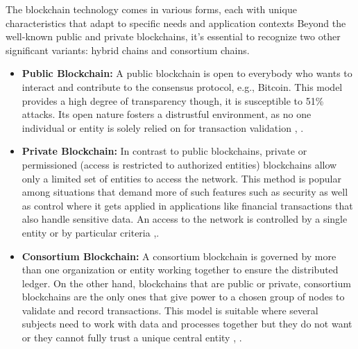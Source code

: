 The blockchain technology comes in various forms, each with unique characteristics that adapt to specific needs and application contexts Beyond the well-known public and 
private blockchains, it's essential to recognize two other significant variants: hybrid chains and consortium chains.

\newpage

\begin{itemize}
  \item \textbf{Public Blockchain:} A public blockchain is open to everybody who wants to interact and contribute to the consensus protocol, e.g., Bitcoin. 
  This model provides a high degree of transparency though, it is susceptible to 51\% attacks. Its open nature fosters a distrustful environment, as no one individual or 
  entity is solely relied on for transaction validation \cite{9596538}, \cite{ibm_blockchain}.
  \item \textbf{Private Blockchain:} In contrast to public blockchains, private or permissioned (access is restricted to authorized entities) blockchains 
  allow only a limited set of entities to access the network. This method is popular among situations that demand more of such features such as security as well as control 
  where it gets applied in applications like financial transactions that also handle sensitive data. An access to the network is controlled by a single entity or by 
  particular criteria \cite{9596538},\cite{9036241}.
 \item \textbf{Consortium Blockchain:} A consortium blockchain is governed by more than one organization or entity working together to ensure the distributed ledger. 
  On the other hand, blockchains that are public or private, consortium blockchains are the only ones that give power to a chosen group of nodes to validate and record 
  transactions. This model is suitable where several subjects need to work with data and processes together but they do not want or they cannot fully trust a unique 
  central entity \cite{ibm_blockchain}, \cite{9752154}.
\end{itemize}


